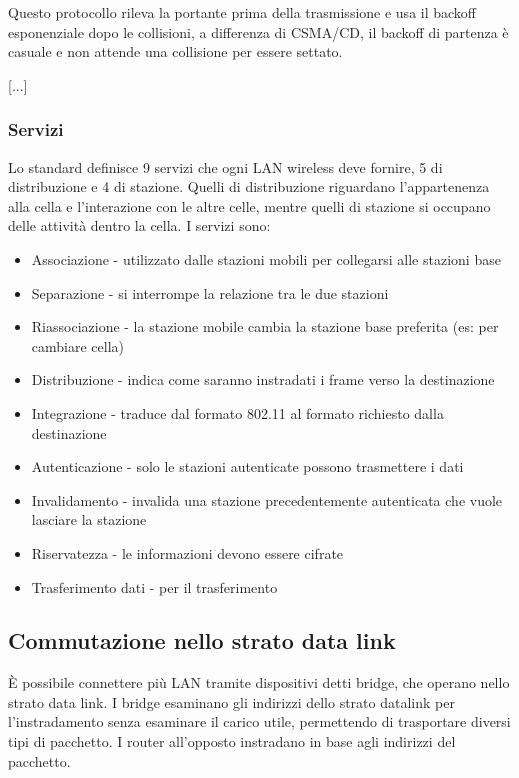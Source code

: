 Questo protocollo rileva la portante prima della trasmissione e usa il backoff esponenziale dopo le collisioni, 
a differenza di CSMA/CD, il backoff di partenza è casuale e non attende una collisione per essere settato.

[...]


\subsubsection{Servizi}
Lo standard definisce 9 servizi che ogni LAN wireless deve fornire, 5 di distribuzione e 4 di stazione.
Quelli di distribuzione riguardano l'appartenenza alla cella e l'interazione con le altre celle, mentre quelli di stazione si occupano delle attività dentro la cella.
I servizi sono:
\begin{itemize}
\item Associazione - utilizzato dalle stazioni mobili per collegarsi alle stazioni base
\item Separazione - si interrompe la relazione tra le due stazioni
\item Riassociazione - la stazione mobile cambia la stazione base preferita (es: per cambiare cella)
\item Distribuzione - indica come saranno instradati i frame verso la destinazione
\item Integrazione - traduce dal formato 802.11 al formato richiesto dalla destinazione
\item Autenticazione - solo le stazioni autenticate possono trasmettere i dati
\item Invalidamento - invalida una stazione precedentemente autenticata che vuole lasciare la stazione
\item Riservatezza - le informazioni devono essere cifrate
\item Trasferimento dati - per il trasferimento
\end{itemize}


\subsection{Commutazione nello strato data link} %
\`E possibile connettere più LAN tramite dispositivi detti bridge, che operano nello strato data link.
I bridge esaminano gli indirizzi dello strato datalink per l'instradamento senza esaminare il carico utile, permettendo di trasportare diversi tipi di pacchetto.
I router all'opposto instradano in base agli indirizzi del pacchetto.

